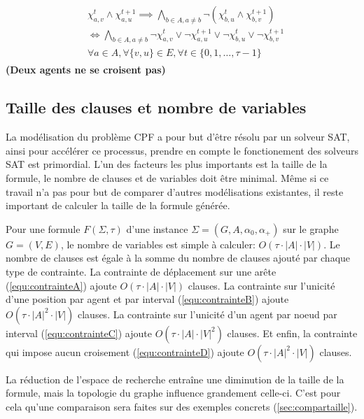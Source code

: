 \documentclass[french, 12pt, letterpaper]{article}
\theoremstyle{definition}
\theoremstyle{proposition}
\theoremstyle{example}
\begin{document}
\begin{itemize}
\begin{align}
                \label{equ:contrainteD}
                \begin{split}
                    &\chi_{a, v}^t \land \chi_{a, u}^{t+1} \implies \bigwedge_{b \in A, a \neq b} \lnot (\chi_{b, u}^t \land \chi_{b, v}^{t+1})
                    \\&\iff \bigwedge_{b \in A, a \neq b} \lnot \chi_{a, v}^t \lor \lnot \chi_{a, u}^{t+1} \lor \lnot \chi_{b, u}^t \lor \lnot \chi_{b, v}^{t+1}
                    \\&\forall a \in A, \forall \{v, u\} \in E, \forall t \in \{0, 1, \ldots, \tau-1\}
                \end{split}
            \end{align}
            \textbf{(Deux agents ne se croisent pas)}
    \end{itemize}

    \subsection{Taille des clauses et nombre de variables}
    \label{sec:tailleclause}

    La modélisation du problème CPF a pour but d'être résolu par un solveur SAT, ainsi pour accélérer ce processus, prendre en compte le fonctionement
    des solveurs SAT est primordial. L'un des facteurs les plus importants est la taille de la formule, le nombre de clauses et de variables doit être minimal.
    Même si ce travail n'a pas pour but de comparer d'autres modélisations existantes, il reste important de calculer la taille de la formule générée.

    Pour une formule $F(\Sigma, \tau)$ d'une instance $\Sigma=( G, A, \alpha_0, \alpha_+)$ sur le graphe $G = ( V, E )$, 
    le nombre de variables est simple à calculer: $O(\tau \cdot |A| \cdot |V|)$. 
    Le nombre de clauses est égale à la somme du nombre de clauses ajouté par chaque type de contrainte.
    La contrainte de déplacement sur une arête (\ref{equ:contrainteA}) ajoute $O(\tau \cdot |A| \cdot |V|)$ clauses.
    La contrainte sur l'unicité d'une position par agent et par interval (\ref{equ:contrainteB}) ajoute $O(\tau \cdot |A|^2 \cdot |V|)$ clauses.
    La contrainte sur l'unicité d'un agent par noeud par interval (\ref{equ:contrainteC}) ajoute $O(\tau \cdot |A| \cdot |V|^2)$ clauses.
    Et enfin, la contrainte qui impose aucun croisement (\ref{equ:contrainteD}) ajoute $O(\tau \cdot |A|^2 \cdot |V|)$ clauses.

    La réduction de l'espace de recherche entraîne une diminution de la taille de la formule, mais la topologie du graphe influence 
    grandement celle-ci. C'est pour cela qu'une comparaison sera faites sur des exemples concrets (\ref{sec:compartaille}). 
\end{document}
